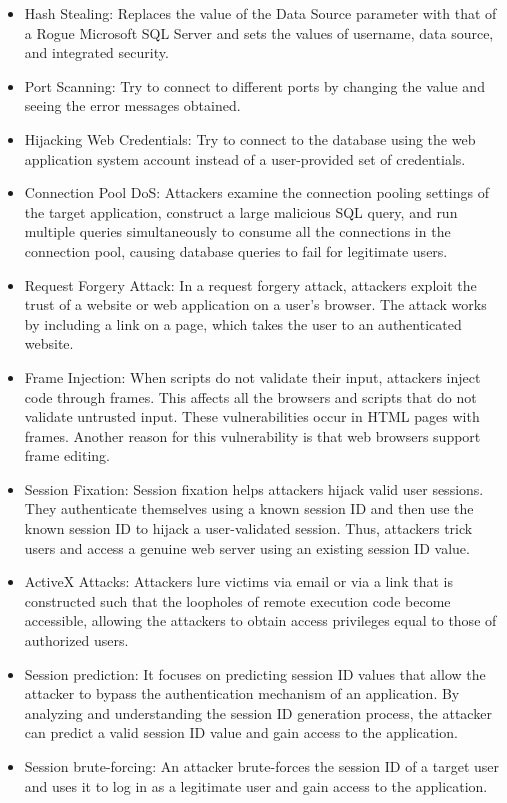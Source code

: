 \begin{itemize}
    \item Hash Stealing: Replaces the value of the Data Source parameter with that of a Rogue Microsoft SQL Server and sets the values of username, data source, and integrated security.
    \item Port Scanning: Try to connect to different ports by changing the value and seeing the error messages obtained.
    \item Hijacking Web Credentials: Try to connect to the database using the web application system account instead of a user-provided set of credentials.
    \item Connection Pool DoS: Attackers examine the connection pooling settings of the target application, construct a large malicious SQL query, and run multiple queries simultaneously to consume all the connections in the connection pool, causing database queries to fail for legitimate users.
    \item Request Forgery Attack: In a request forgery attack, attackers exploit the trust of a website or web application on a user's browser. The attack works by including a link on a page, which takes the user to an authenticated website.
    \item Frame Injection: When scripts do not validate their input, attackers inject code through frames. This affects all the browsers and scripts that do not validate untrusted input. These vulnerabilities occur in HTML pages with frames. Another reason for this vulnerability is that web browsers support frame editing.
    \item Session Fixation: Session fixation helps attackers hijack valid user sessions. They authenticate themselves using a known session ID and then use the known session ID to hijack a user-validated session. Thus, attackers trick users and access a genuine web server using an existing session ID value.
    \item ActiveX Attacks: Attackers lure victims via email or via a link that is constructed such that the loopholes of remote execution code become accessible, allowing the attackers to obtain access privileges equal to those of authorized users.
    \item Session prediction: It focuses on predicting session ID values that allow the attacker to bypass the authentication mechanism of an application. By analyzing and understanding the session ID generation process, the attacker can predict a valid session ID value and gain access to the application.
    \item Session brute-forcing: An attacker brute-forces the session ID of a target user and uses it to log in as a legitimate user and gain access to the application.

\end{itemize}
